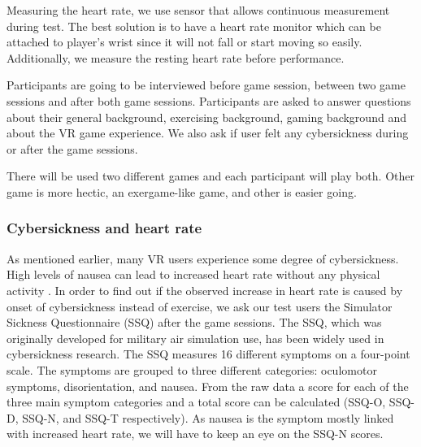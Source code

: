 \documentclass{sig-alternate-05-2015}
\begin{document}
Measuring the heart rate, we use sensor that allows continuous measurement 
during test. The best solution is to have a heart rate monitor which can 
be attached to player’s wrist since it will not fall or start moving so 
easily. Additionally, we measure the resting heart rate before performance.

Participants are going to be interviewed before game session, between two 
game sessions and after both game sessions. Participants are asked to 
answer questions about their general background, exercising background, 
gaming background and about the VR game experience. We also ask if user 
felt any cybersickness during or after the game sessions. 

There will be used two different games and each participant will play both. 
Other game is more hectic, an exergame-like game, and other is easier going.

\subsubsection{Cybersickness and heart rate}
As mentioned earlier, many VR users experience some degree of cybersickness. 
High levels of nausea can lead to increased heart rate without any physical 
activity \cite{nalivaiko2015cybersickness}. In order to find out if the observed increase 
in heart rate is caused by onset of cybersickness instead of exercise, we ask 
our test users the Simulator Sickness Questionnaire (SSQ) \cite{kennedy1993simulator} 
after the game sessions. The SSQ, which was originally developed for military air 
simulation use, has been widely used in cybersickness research. The SSQ measures 
16 different symptoms on a four-point scale. The symptoms are grouped to three 
different categories: oculomotor symptoms, disorientation, and nausea. From 
the raw data a score for each of the three main symptom categories and a total 
score can be calculated (SSQ-O, SSQ-D, SSQ-N, and SSQ-T respectively). As nausea 
is the symptom mostly linked with increased heart rate, we will have to keep an 
eye on the SSQ-N scores.
\end{document}
